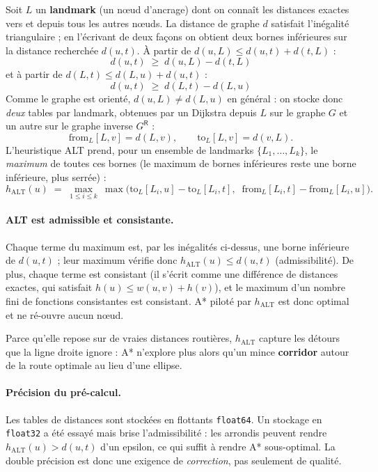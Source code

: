 Soit $L$ un \textbf{landmark} (un nœud d'ancrage) dont on connaît les distances
exactes vers et depuis tous les autres nœuds. La distance de graphe $d$ satisfait
l'inégalité triangulaire ; en l'écrivant de deux façons on obtient deux bornes
inférieures sur la distance recherchée $d(u,t)$. À partir de
$d(u,L) \le d(u,t) + d(t,L)$ :
\[
  d(u, t) \;\ge\; d(u, L) - d(t, L)
  \tag{le landmark est « derrière » la cible}
\]
et à partir de $d(L,t) \le d(L,u) + d(u,t)$ :
\[
  d(u, t) \;\ge\; d(L, t) - d(L, u)
  \tag{le landmark est « devant » la cible.}
\]
Comme le graphe est orienté, $d(u,L) \neq d(L,u)$ en général : on stocke donc
\emph{deux} tables par landmark, obtenues par un Dijkstra depuis $L$ sur le graphe
$G$ et un autre sur le graphe inverse $G^{\mathsf R}$ :
\[
  \text{from}_L[L, v] = d(L, v),
  \qquad
  \text{to}_L[L, v] = d(v, L).
\]
L'heuristique ALT prend, pour un ensemble de landmarks $\{L_1,\dots,L_k\}$, le
\emph{maximum} de toutes ces bornes (le maximum de bornes inférieures reste une
borne inférieure, plus serrée) :
\[
  h_{\text{ALT}}(u) \;=\; \max_{1 \le i \le k}\ \max\!\Big(
     \text{to}_L[L_i,u] - \text{to}_L[L_i,t],\;\;
     \text{from}_L[L_i,t] - \text{from}_L[L_i,u]
  \Big).
\]

\paragraph{ALT est admissible et consistante.}
Chaque terme du maximum est, par les inégalités ci-dessus, une borne inférieure
de $d(u,t)$ ; leur maximum vérifie donc $h_{\text{ALT}}(u) \le d(u,t)$
(admissibilité). De plus, chaque terme est consistant (il s'écrit comme une
différence de distances exactes, qui satisfait $h(u) \le w(u,v) + h(v)$), et le
maximum d'un nombre fini de fonctions consistantes est consistant. A* piloté par
$h_{\text{ALT}}$ est donc optimal et ne ré-ouvre aucun nœud.

\noindent
Parce qu'elle repose sur de vraies distances routières, $h_{\text{ALT}}$ capture
les détours que la ligne droite ignore : A* n'explore plus alors qu'un mince
\textbf{corridor} autour de la route optimale au lieu d'une ellipse.

\paragraph{Précision du pré-calcul.}
Les tables de distances sont stockées en flottants \texttt{float64}. Un stockage
en \texttt{float32} a été essayé mais brise l'admissibilité : les arrondis
peuvent rendre $h_{\text{ALT}}(u) > d(u,t)$ d'un epsilon, ce qui suffit à rendre
A* sous-optimal. La double précision est donc une exigence de \emph{correction},
pas seulement de qualité.


